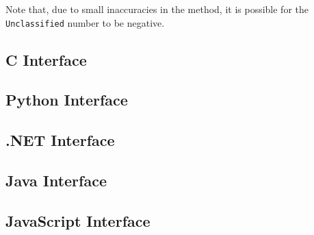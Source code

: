 \documentclass{book}
\begin{document}
\noindent Note that, due to small inaccuracies in the method, it is possible for the \texttt{Unclassified} number to be negative.

\begin{cpdflib}
\clearpage
\section*{C Interface}
\begin{small}\tt

\end{small}
\end{cpdflib}

\begin{pycpdflib}
\clearpage
\section*{Python Interface}
\begin{small}\tt

\end{small}
\end{pycpdflib}

\begin{dotnetcpdflib}
\clearpage
\section*{.NET Interface}
\begin{small}\tt

\end{small}
\end{dotnetcpdflib}

\begin{jcpdflib}
\clearpage
\section*{Java Interface}
\begin{small}\tt

\end{small}
\end{jcpdflib}

\begin{jscpdflib}
\clearpage
\section*{JavaScript Interface}
\begin{small}\tt

\end{small}
\end{jscpdflib}
\end{document}
